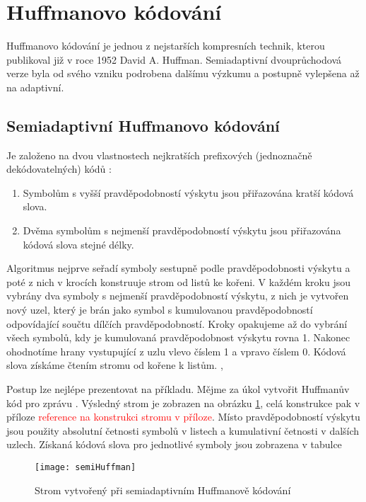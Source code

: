 \section{Huffmanovo kódování}
\label{huffmanovoKodovani}
Huffmanovo kódování je jednou z nejstarších kompresních technik, kterou publikoval již v roce 1952 David A. Huffman. Semiadaptivní dvouprůchodová verze byla od svého vzniku podrobena dalšímu výzkumu a postupně vylepšena až na adaptivní.

\subsection{Semiadaptivní Huffmanovo kódování}
Je založeno na dvou vlastnostech nejkratších prefixových (jednoznačně dekódovatelných) kódů \cite{introductionToDataCompression}:

\begin{enumerate}
\item Symbolům s vyšší pravděpodobností výskytu jsou přiřazována kratší kódová slova.
\item Dvěma symbolům s nejmenší pravděpodobností výskytu jsou přiřazována kódová slova stejné délky.
\end{enumerate}

Algoritmus nejprve seřadí symboly sestupně podle pravděpodobnosti výskytu a poté z nich v krocích konstruuje strom od listů ke kořeni. V každém kroku jsou vybrány dva symboly s nejmenší pravděpodobností výskytu, z nich je vytvořen nový uzel, který je brán jako symbol s kumulovanou pravděpodobností odpovídající součtu dílčích pravděpodobností. Kroky opakujeme až do vybrání všech symbolů, kdy je kumulovaná pravděpodobnost výskytu rovna 1. Nakonec ohodnotíme hrany vystupující z uzlu vlevo číslem 1 a vpravo číslem 0. Kódová slova získáme čtením stromu od kořene k listům. \cite{dataCompression}, \cite{introductionToDataCompression}

Postup lze nejlépe prezentovat na příkladu. Mějme za úkol vytvořit Huffmanův kód pro zprávu . Výsledný strom je zobrazen na obrázku \ref{semiHuffmanStrom}, celá konstrukce pak v příloze \textcolor{red}{reference na konstrukci stromu v příloze}. Místo pravděpodobností výskytu jsou použity absolutní četnosti symbolů v listech a kumulativní četnosti v dalších uzlech. Získaná kódová slova pro jednotlivé symboly jsou zobrazena v tabulce 

\begin{figure}[!htb]
\centering
\texttt{[image: semiHuffman]}
\caption{Strom vytvořený při semiadaptivním Huffmanově kódování}
\label{semiHuffmanStrom}
\end{figure}


